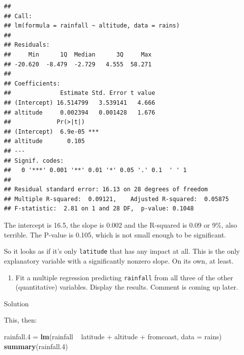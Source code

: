 \documentclass[]{tufte-book}
\newenvironment{Shaded}{}{}
\newcommand{\DataTypeTok}[1]{\textcolor[rgb]{0.56,0.13,0.00}{#1}}
\newcommand{\FloatTok}[1]{\textcolor[rgb]{0.25,0.63,0.44}{#1}}
\newcommand{\KeywordTok}[1]{\textcolor[rgb]{0.00,0.44,0.13}{\textbf{#1}}}
\newcommand{\NormalTok}[1]{#1}
\newcommand{\OperatorTok}[1]{\textcolor[rgb]{0.40,0.40,0.40}{#1}}
\newcommand{\StringTok}[1]{\textcolor[rgb]{0.25,0.44,0.63}{#1}}
\providecommand{\tightlist}{%
  \setlength{\itemsep}{0pt}\setlength{\parskip}{0pt}}
\theoremstyle{definition}
\theoremstyle{definition}
\theoremstyle{definition}
\theoremstyle{remark}
\begin{document}
\begin{verbatim}
## 
## Call:
## lm(formula = rainfall ~ altitude, data = rains)
## 
## Residuals:
##     Min      1Q  Median      3Q     Max 
## -20.620  -8.479  -2.729   4.555  58.271 
## 
## Coefficients:
##              Estimate Std. Error t value
## (Intercept) 16.514799   3.539141   4.666
## altitude     0.002394   0.001428   1.676
##             Pr(>|t|)    
## (Intercept)  6.9e-05 ***
## altitude       0.105    
## ---
## Signif. codes:  
##   0 '***' 0.001 '**' 0.01 '*' 0.05 '.' 0.1  ' ' 1
## 
## Residual standard error: 16.13 on 28 degrees of freedom
## Multiple R-squared:  0.09121,    Adjusted R-squared:  0.05875 
## F-statistic:  2.81 on 1 and 28 DF,  p-value: 0.1048
\end{verbatim}

The intercept is 16.5, the slope is 0.002 and the R-squared is 0.09 or
9\%, also terrible. The P-value is 0.105, which is not small enough to
be significant.

So it looks as if it's only \texttt{latitude} that has any impact at
all. This is the only explanatory variable with a significantly nonzero
slope. On its own, at least.

\begin{enumerate}
\def\labelenumi{(\alph{enumi})}
\setcounter{enumi}{5}
\tightlist
\item
  Fit a multiple regression predicting \texttt{rainfall} from all three
  of the other (quantitative) variables. Display the results. Comment is
  coming up later.
\end{enumerate}

Solution

This, then:

\begin{Shaded}
\begin{Highlighting}[]
\NormalTok{rainfall}\FloatTok{.4}\NormalTok{ =}\StringTok{ }\KeywordTok{lm}\NormalTok{(rainfall }\OperatorTok{~}\StringTok{ }\NormalTok{latitude }\OperatorTok{+}\StringTok{ }\NormalTok{altitude }\OperatorTok{+}\StringTok{ }
\StringTok{    }\NormalTok{fromcoast, }\DataTypeTok{data =}\NormalTok{ rains)}
\KeywordTok{summary}\NormalTok{(rainfall}\FloatTok{.4}\NormalTok{)}
\end{Highlighting}
\end{Shaded}
\end{document}

